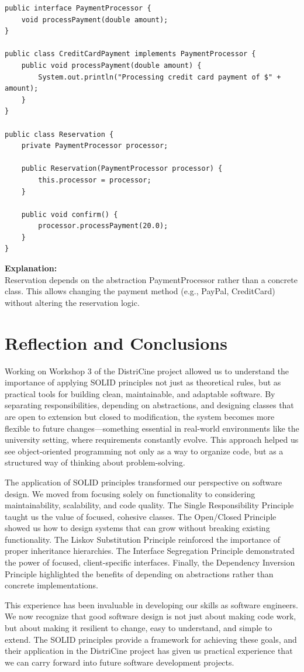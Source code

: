 \documentclass[12pt, letterpaper]{article}
\begin{document}
\begin{lstlisting}[caption=DIP Implementation Example]
public interface PaymentProcessor {
    void processPayment(double amount);
}

public class CreditCardPayment implements PaymentProcessor {
    public void processPayment(double amount) {
        System.out.println("Processing credit card payment of $" + amount);
    }
}

public class Reservation {
    private PaymentProcessor processor;
    
    public Reservation(PaymentProcessor processor) {
        this.processor = processor;
    }
    
    public void confirm() {
        processor.processPayment(20.0);
    }
}
\end{lstlisting}

\textbf{Explanation:}\\
Reservation depends on the abstraction PaymentProcessor rather than a concrete class. This allows changing the payment method (e.g., PayPal, CreditCard) without altering the reservation logic.

\section{Reflection and Conclusions}

Working on Workshop 3 of the DistriCine project allowed us to understand the importance of applying SOLID principles not just as theoretical rules, but as practical tools for building clean, maintainable, and adaptable software. By separating responsibilities, depending on abstractions, and designing classes that are open to extension but closed to modification, the system becomes more flexible to future changes—something essential in real-world environments like the university setting, where requirements constantly evolve. This approach helped us see object-oriented programming not only as a way to organize code, but as a structured way of thinking about problem-solving.

The application of SOLID principles transformed our perspective on software design. We moved from focusing solely on functionality to considering maintainability, scalability, and code quality. The Single Responsibility Principle taught us the value of focused, cohesive classes. The Open/Closed Principle showed us how to design systems that can grow without breaking existing functionality. The Liskov Substitution Principle reinforced the importance of proper inheritance hierarchies. The Interface Segregation Principle demonstrated the power of focused, client-specific interfaces. Finally, the Dependency Inversion Principle highlighted the benefits of depending on abstractions rather than concrete implementations.

This experience has been invaluable in developing our skills as software engineers. We now recognize that good software design is not just about making code work, but about making it resilient to change, easy to understand, and simple to extend. The SOLID principles provide a framework for achieving these goals, and their application in the DistriCine project has given us practical experience that we can carry forward into future software development projects.
\end{document}
